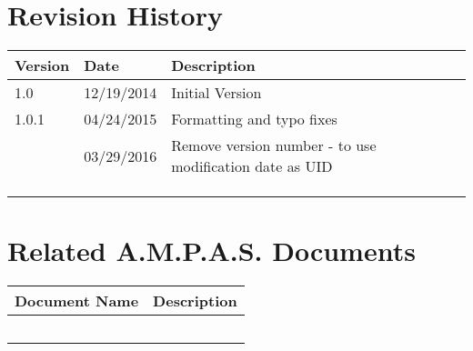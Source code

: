 \prelimsectionformat	%
\chapter{Revision History}

\begin{tabularx}{\linewidth}{|l|l|X|}
    \hline
    Version & Date       & Description \\ \hline
    1.0     & 12/19/2014 & Initial Version
    \\ \hline
    1.0.1   & 04/24/2015 & Formatting and typo fixes \\ \hline
            & 03/29/2016 & Remove version number - to use modification date as UID \\ \hline
    &   &   \\ \hline
    &   &   \\ \hline
    &   &   \\ \hline
\end{tabularx}

\vspace{0.25in} %
\chapter{Related A.M.P.A.S. Documents} %
\begin{tabularx}{\linewidth}{|l|X|}
    \hline
    Document Name & Description \\ \hline
    & \\ \hline
    & \\ \hline
    & \\ \hline
    & \\ \hline
    & \\ \hline
\end{tabularx}